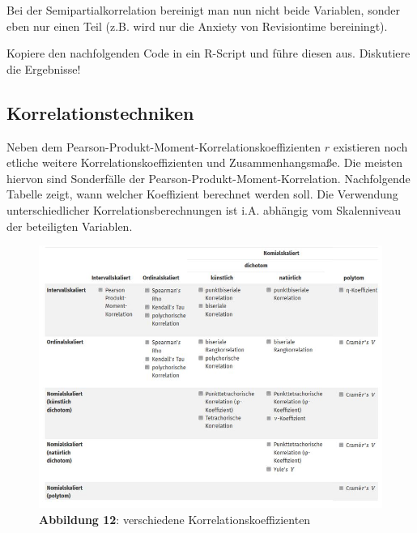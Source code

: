 \documentclass[
]{article}
\newenvironment{Shaded}{\begin{snugshade}}{\end{snugshade}}
\newcommand{\CommentTok}[1]{\textcolor[rgb]{0.56,0.35,0.01}{\textit{#1}}}
\newcommand{\DecValTok}[1]{\textcolor[rgb]{0.00,0.00,0.81}{#1}}
\newcommand{\FunctionTok}[1]{\textcolor[rgb]{0.13,0.29,0.53}{\textbf{#1}}}
\newcommand{\NormalTok}[1]{#1}
\newcommand{\OtherTok}[1]{\textcolor[rgb]{0.56,0.35,0.01}{#1}}
\newcommand{\SpecialCharTok}[1]{\textcolor[rgb]{0.81,0.36,0.00}{\textbf{#1}}}
\begin{document}
Bei der Semipartialkorrelation bereinigt man nun nicht beide Variablen, sonder eben nur einen Teil (z.B. wird nur die Anxiety von Revisiontime bereiningt).

Kopiere den nachfolgenden Code in ein R-Script und führe diesen aus. Diskutiere die Ergebnisse!

\begin{Shaded}
\end{Shaded}

\subsection*{Korrelationstechniken}\label{korrelationstechniken}

Neben dem Pearson-Produkt-Moment-Korrelationskoeffizienten \(r\) existieren noch etliche weitere Korrelationskoeffizienten und Zusammenhangsmaße. Die meisten hiervon sind Sonderfälle der Pearson-Produkt-Moment-Korrelation. Nachfolgende Tabelle zeigt, wann welcher Koeffizient berechnet werden soll. Die Verwendung unterschiedlicher Korrelationsberechnungen ist i.A. abhängig vom Skalenniveau der beteiligten Variablen.

\begin{figure}
\centering
\includegraphics[width=1\textwidth,height=\textheight]{Images/Korrelationsarten.JPG}
\caption{\textbf{Abbildung 12}: verschiedene Korrelationskoeffizienten}
\end{figure}
\end{document}
